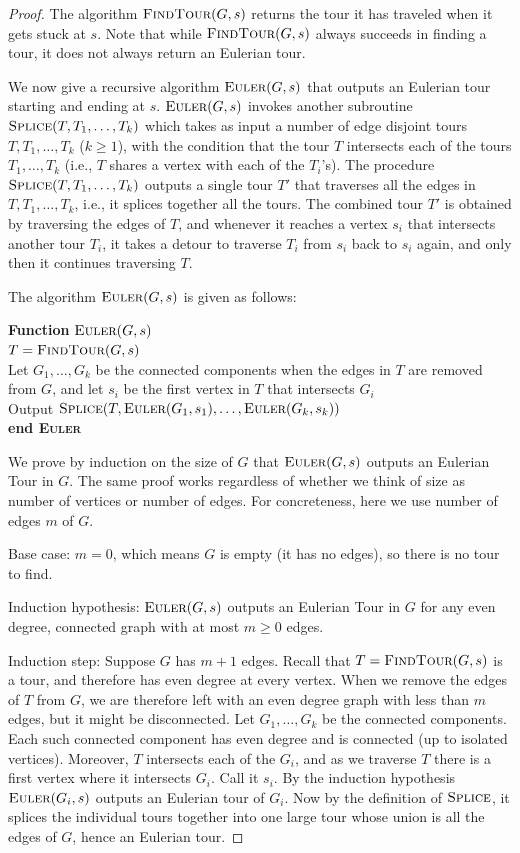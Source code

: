\documentclass[11pt]{article}
\newcounter{thm}
\newcommand{\findtour}{\textsc{FindTour}}
\newcommand{\euler}{\textsc{Euler}}
\newcommand{\splice}{\textsc{Splice}}
\begin{document}
\begin{proof}
The algorithm $\findtour(G,s)$ returns the tour it has traveled when it gets stuck at $s$. Note that while $\findtour(G,s)$ always succeeds in finding a tour, it does not always return an Eulerian tour.

We now give a recursive algorithm $\euler(G, s)$ that outputs an Eulerian tour starting and ending at $s$. $\euler(G,s)$ invokes
another subroutine $\splice(T, T_1, \ldots, T_k)$ which takes as input a number of edge disjoint tours $T, T_1,\dots,T_k$ ($k \ge 1$), with the condition that the tour $T$ intersects each of the 
tours $T_1, \ldots, T_k$ (i.e., $T$ shares a vertex with each of the $T_i$'s). The procedure $\splice(T, T_1, \ldots, T_k)$ outputs a single tour $T'$ that traverses all the edges in $T, T_1,\dots,T_k$, i.e., it splices together all the tours. The combined tour $T'$ is obtained by traversing the edges of $T$, and whenever it reaches a vertex $s_i$ that intersects another tour $T_i$, it takes a detour to traverse $T_i$ from $s_i$ back to $s_i$ again, and only then it continues traversing $T$.

The algorithm $\euler(G,s)$ is given as follows:


{\bf Function} $\euler(G, s)$\\
\phantom{.~~~~~} $T = \findtour(G, s)$\\
\phantom{.~~~~~} Let $G_1, \ldots, G_k$ be the connected components when the edges in $T$ are removed from $G$, and let $s_i$ be the first vertex in $T$ that intersects $G_i$ \\
\phantom{.~~~~~} Output $\splice(T, \euler(G_1, s_1), \ldots, \euler(G_k, s_k))$\\
{\bf end \euler}

We prove by induction on the size of $G$ that $\euler(G,s)$ outputs an Eulerian Tour in $G$. The same proof works regardless of whether we think of size as number of vertices or number of edges. For concreteness, here we use number of edges $m$ of $G$.

Base case: $m = 0$, which means $G$ is empty (it has no edges), so there is no tour to find.

Induction hypothesis: $\euler(G,s)$ outputs an Eulerian Tour in $G$ for any even degree, connected graph with at most $m \ge 0$ edges. 

Induction step: Suppose $G$ has $m+1$ edges. Recall that $T = \findtour(G, s)$ is a tour, and therefore has even degree at every vertex. When we remove the edges of $T$ from $G$,
we are therefore left with an even degree graph with less than $m$ edges, but it might be disconnected. Let $G_1, \ldots, G_k$ be the connected
components. Each such connected component has even degree and is connected (up to isolated vertices). Moreover, $T$ intersects each of 
the $G_i$, and as we traverse $T$ there is a first vertex where it intersects $G_i$. Call it $s_i$. By the induction hypothesis
$\euler(G_i, s)$ outputs an Eulerian tour of $G_i$. Now by the definition of $\splice$, it splices the individual tours together into one large tour
whose union is all the edges of $G$, hence an Eulerian tour. 
\end{proof}
 
\end{document}
